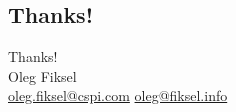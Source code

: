 \documentclass[xcolor=x11names,compress]{beamer}
\makeatletter
\renewcommand{\(}{\begin{columns}}
\renewcommand{\)}{\end{columns}}
\newcommand{\<}[1]{\begin{column}{#1}}
\renewcommand{\>}{\end{column}}
\def \AuthorEmail {\href{mailto:oleg.fiksel@cspi.com}{oleg.fiksel@cspi.com}}
\makeatother
\begin{document}
\subsection*{Thanks!}
\begin{frame}[fragile]{}
\begin{center}
	\huge{Thanks!}\\[2em]
	\normalsize{Oleg Fiksel}\\[0.5em]
	\footnotesize{ \AuthorEmail \hspace{0.5pt} \textbar \hspace{0.5pt} \href{mailto:oleg@fiksel.info}{oleg@fiksel.info}}
\end{center}
\end{frame}
\end{document}
